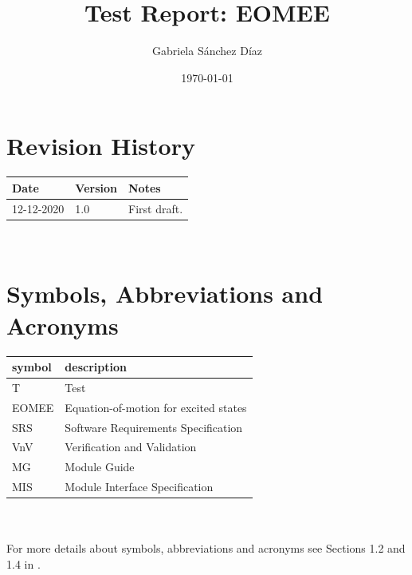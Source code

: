 \documentclass[12pt, titlepage]{article}
\begin{document}
\title{Test Report: EOMEE} 
\author{Gabriela S\'anchez D\'iaz}
\date{\today}
	
\maketitle


\section{Revision History}

\begin{tabularx}{\textwidth}{p{3cm}p{2cm}X}
\toprule {\bf Date} & {\bf Version} & {\bf Notes}\\
\midrule
12-12-2020 & 1.0 & First draft.\\
\bottomrule
\end{tabularx}

~\newpage

\section{Symbols, Abbreviations and Acronyms}

\renewcommand{\arraystretch}{1.2}
\begin{tabular}{l l} 
  \toprule		
  \textbf{symbol} & \textbf{description}\\
  \midrule 
  T & Test\\
  EOMEE & Equation-of-motion for excited states\\
  SRS & Software Requirements Specification\\
  VnV & Verification and Validation\\
  MG & Module Guide\\
  MIS & Module Interface Specification\\
  \bottomrule
\end{tabular}\\

\\
\newline For more details about symbols, abbreviations and acronyms see 
Sections 1.2 and 
1.4 in \cite{SRS2020}.

\newpage

\tableofcontents

\listoftables %
\end{document}
